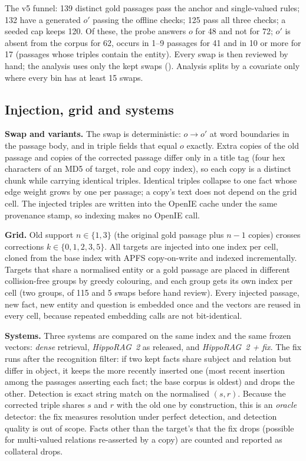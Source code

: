 The v5 funnel: 139 distinct gold passages pass the anchor and single-valued rules; 132 have a generated $o'$ passing the
offline checks; 125 pass all three checks; a seeded cap keeps 120. Of these, the probe answers $o$ for 48 and not for
72; $o'$ is absent from the corpus for 62, occurs in 1--9 passages for 41 and in 10 or more for 17 (passages whose
triples contain the entity). Every swap is then reviewed by hand; the analysis uses only the kept swaps
(). Analysis splits by a covariate only where every bin has at least 15 swaps.

\subsection{Injection, grid and systems}\label{sec:grid}
\textbf{Swap and variants.} The swap is deterministic: $o \to o'$ at word boundaries in the passage body, and in triple
fields that equal $o$ exactly. Extra copies of the old passage and copies of the corrected passage differ only in a
title tag (four hex characters of an MD5 of target, role and copy index), so each copy is a distinct chunk while
carrying identical triples. Identical triples collapse to one fact whose edge weight grows by one per passage; a copy's
text does not depend on the grid cell. The injected triples are written into the OpenIE cache under the same
provenance stamp, so indexing makes no OpenIE call.

\textbf{Grid.} Old support $n \in \{1, 3\}$ (the original gold passage plus $n-1$ copies) crosses corrections
$k \in \{0, 1, 2, 3, 5\}$. All targets are injected into one index per cell, cloned from the base index with APFS
copy-on-write and indexed incrementally. Targets that share a normalised entity or a gold passage are placed in
different collision-free groups by greedy colouring, and each group gets its own index per cell (two groups, of 115
and 5 swaps before hand review). Every injected passage, new fact, new entity and question is embedded once and the
vectors are reused in every cell, because repeated embedding calls are not bit-identical.

\textbf{Systems.} Three systems are compared on the same index and the same frozen vectors: \emph{dense} retrieval,
\emph{HippoRAG~2} as released, and \emph{HippoRAG~2 + fix}. The fix runs after the recognition filter: if two kept facts
share subject and relation but differ in object, it keeps the more recently inserted one (most recent insertion among
the passages asserting each fact; the base corpus is oldest) and drops the other. Detection is exact string match on the
normalised $(s, r)$. Because the corrected triple shares $s$ and $r$ with the old one by construction, this is an
\emph{oracle} detector: the fix measures resolution under perfect detection, and detection quality is out of scope.
Facts other than the target's that the fix drops (possible for multi-valued relations re-asserted by a copy) are
counted and reported as collateral drops.

